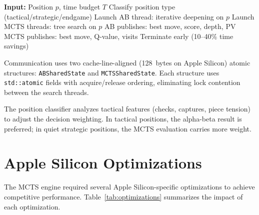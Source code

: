 \documentclass{svproc}
\begin{document}
\begin{algorithm}[!htbp]
\caption{Parallel Hybrid Search}
\label{alg:hybrid}
\begin{algorithmic}[1]
\State \textbf{Input:} Position $p$, time budget $T$
\State Classify position type (tactical/strategic/endgame)
\State Launch AB thread: iterative deepening on $p$
\State Launch MCTS threads: tree search on $p$
    \State AB publishes: best move, score, depth, PV 
    \State MCTS publishes: best move, Q-value, visits 
        \State Terminate early (10--40\% time savings)
    \EndIf
\EndWhile
\State \Return {}
\end{algorithmic}
\end{algorithm}

Communication uses two cache-line-aligned (128~bytes on Apple Silicon) atomic structures: \texttt{ABSharedState} and \texttt{MCTSSharedState}. Each structure uses \texttt{std::atomic} fields with acquire/release ordering, eliminating lock contention between the search threads.

The position classifier analyzes tactical features (checks, captures, piece tension) to adjust the decision weighting. In tactical positions, the alpha-beta result is preferred; in quiet strategic positions, the MCTS evaluation carries more weight.



\FloatBarrier
\section{Apple Silicon Optimizations}
\label{sec:optimizations}

The MCTS engine required several Apple Silicon-specific optimizations to achieve competitive performance. Table~\ref{tab:optimizations} summarizes the impact of each optimization.
\end{document}
